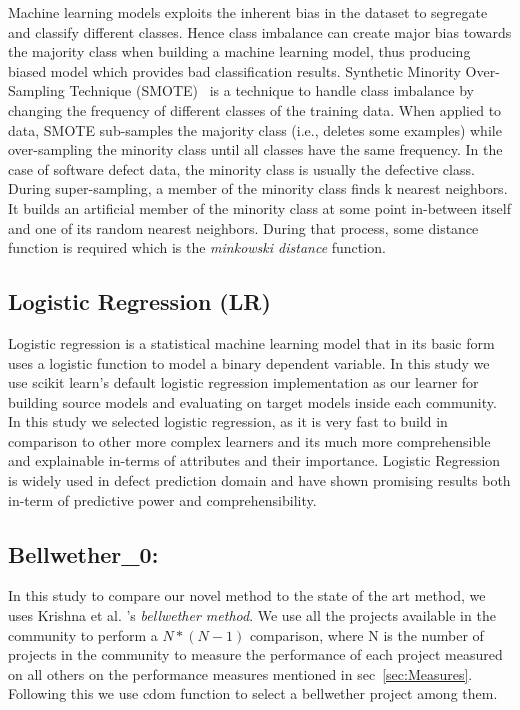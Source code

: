 \documentclass[sigconf]{acmart}
\theoremstyle{break}
\begin{document}
Machine learning models exploits the inherent bias in the dataset to segregate and classify different classes. Hence class imbalance can create major bias towards the majority class when building a machine learning model, thus producing biased model which provides bad classification results. Synthetic Minority Over-Sampling Technique (SMOTE)~\cite{chawla2002smote} is a technique to handle class imbalance by changing the frequency of different classes of the training data. When applied to data, SMOTE sub-samples the majority class (i.e., deletes some examples) while over-sampling the minority class until all classes have the same frequency. In the case of software defect data, the minority class is usually the defective class. During super-sampling, a member of the minority class finds k nearest neighbors. It builds an artificial member of the minority class at some point in-between itself and one of its random nearest neighbors. During that process, some distance function is required which is the \textit{minkowski distance} function.

\subsection{Logistic Regression (LR)}
\label{subsec:LR}

Logistic regression is a statistical machine learning model that in its basic form uses a logistic function to model a binary dependent variable. In this study we use scikit learn's default logistic regression implementation as our learner for building source models and evaluating on target models inside each community. In this study we selected logistic regression, as it is very fast to build in comparison to other more complex learners and its much more comprehensible and explainable in-terms of attributes and their importance. Logistic Regression is widely used in defect prediction domain and have shown promising results both in-term of predictive power and comprehensibility.


\subsection{Bellwether\_0:}
\label{Bellwether}

In this study to compare our novel method to the state of the art method, we uses Krishna et al. 's \textit{bellwether method}. We use all the projects available in the community to perform a $N*(N-1)$ comparison, where N is the number of projects in the community to measure the performance of each project measured on all others on the performance measures mentioned in sec~\ref{sec:Measures}. Following this we use cdom function to select a bellwether project among them. 
\end{document}
